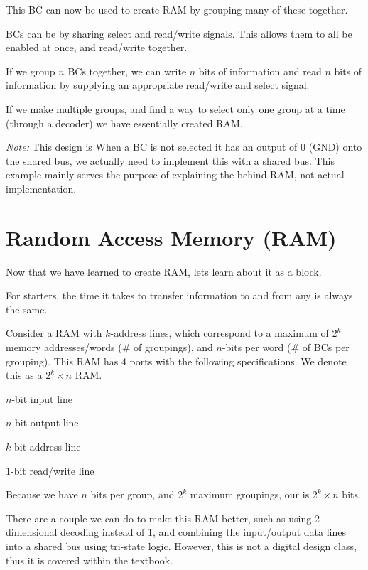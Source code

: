 This BC can now be used to create RAM by grouping many of these together.
\begin{bullets}
	\item BCs can be  by sharing select and read/write signals. This allows them to all be enabled at once, and read/write together.
	\item If we group $n$ BCs together, we can write $n$ bits of information and read $n$ bits of information by supplying an appropriate read/write and select signal.
	\item If we make multiple groups, and find a way to select only one group at a time (through a decoder) we have essentially created RAM.
\end{bullets} 
{\itshape Note:} This design is  When a BC is not selected it has an output of 0 (GND) onto the shared bus, we actually need  to implement this with a shared bus. This example mainly serves the purpose of explaining the  behind RAM, not actual implementation.

\section{Random Access Memory (RAM)}
Now that we have learned to create RAM, lets learn about it as a block. 

For starters, the time it takes to transfer information to and from any  is always the same.

Consider a RAM with $k$-address lines, which correspond to a maximum of $2^k$ memory addresses/words (\# of groupings), and $n$-bits per word (\# of BCs per grouping). This RAM has 4 ports with the following specifications. We denote this as a $2^k \times n$ RAM.
\begin{bullets}
	\item $n$-bit input line
	\item $n$-bit output line
	\item $k$-bit address line
	\item $1$-bit read/write line
\end{bullets}
Because we have $n$ bits per group, and $2^k$ maximum groupings, our  is $2^k \times n$ bits. 

There are a couple  we can do to make this RAM better, such as using 2 dimensional decoding instead of 1, and combining the input/output data lines into a shared bus using tri-state logic. However, this is not a digital design class, thus it is covered within the textbook.

